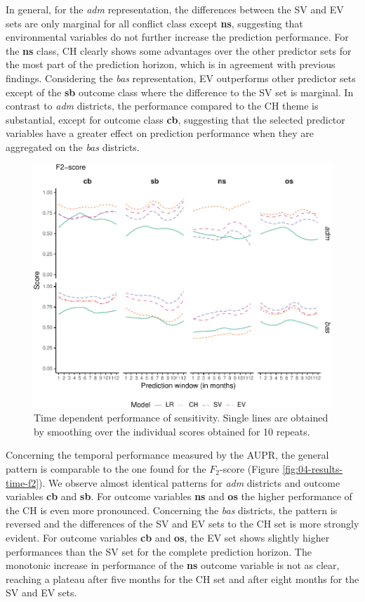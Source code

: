 \documentclass[a4paper,11pt]{article}
\begin{document}
In general, for the \emph{adm} representation, the differences between the SV and EV
sets are only marginal for all conflict class except \textbf{ns}, suggesting that
environmental variables do not further increase the prediction performance.
For the \textbf{ns} class, CH clearly shows some advantages over the other predictor
sets for the most part of the prediction horizon, which is in agreement with previous
findings. Considering the \emph{bas} representation, EV outperforms other predictor sets
except of the \textbf{sb} outcome class where the difference to the SV set is marginal.
In contrast to \emph{adm} districts, the performance compared to the CH theme is substantial,
except for outcome class \textbf{cb}, suggesting that the selected predictor
variables have a greater effect on prediction performance when they are aggregated
on the \emph{bas} districts.
\begin{figure}[H]

{\centering \includegraphics{thesis_files/figure-latex/04-results-time-sensitivity-1} 

}

\caption[Time dependent performance of senstivity.]{Time dependent performance of sensitivity. Single lines are obtained by smoothing over the individual scores obtained for 10 repeats.}\label{fig:04-results-time-sensitivity}
\end{figure}
Concerning the temporal performance measured by the AUPR, the general
pattern is comparable to the one found for the \(F_2\)-score (Figure
\ref{fig:04-results-time-f2}). We observe almost identical patterns for \emph{adm}
districts and outcome variables \textbf{cb} and \textbf{sb}. For outcome variables \textbf{ns} and
\textbf{os} the higher performance of the CH is even more pronounced.
Concerning the \emph{bas} districts, the pattern is reversed and the differences of
the SV and EV sets to the CH set is more strongly evident. For outcome variables
\textbf{cb} and \textbf{os}, the EV set shows slightly higher performances than the SV
set for the complete prediction horizon.
The monotonic increase in performance of the \textbf{ns} outcome variable is not as
clear, reaching a plateau after five months for the CH set and after eight months
for the SV and EV sets.
\end{document}
